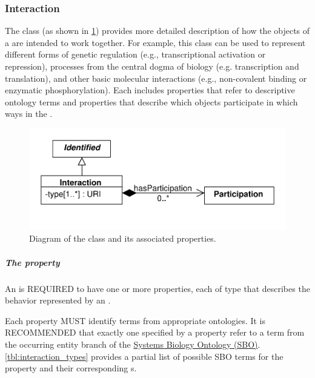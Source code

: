 
\subsubsection{Interaction}
\label{sec:Interaction}

The  class (as shown in \ref{uml:interaction}) provides more detailed description of how the  objects of a  are intended to work together.  
For example, this class can be used to represent different forms of genetic regulation (e.g., transcriptional activation or repression), processes from the central dogma of biology (e.g. transcription and translation), and other basic molecular interactions (e.g., non-covalent binding or enzymatic phosphorylation).
Each  includes  properties that refer to descriptive ontology terms and  properties that describe which  objects participate in which ways in the .

\begin{figure}[ht]
\begin{center}
\includegraphics[scale=0.6]{uml/interaction}
\caption[]{Diagram of the  class and its associated properties.}
\label{uml:interaction}
\end{center}
\end{figure}

\subparagraph{The  property}\label{sec:type:I}

An  is REQUIRED to have one or more  properties, each of type  that describes the behavior represented by an .

Each  property MUST identify terms from appropriate ontologies. 
It is RECOMMENDED that exactly one  specified by a  property refer to a term from the occurring entity branch of the \href{http://www.ebi.ac.uk/sbo/main/}{Systems Biology Ontology (SBO)}.
\ref{tbl:interaction_types} provides a partial list of possible SBO terms for the  property and their corresponding s.

